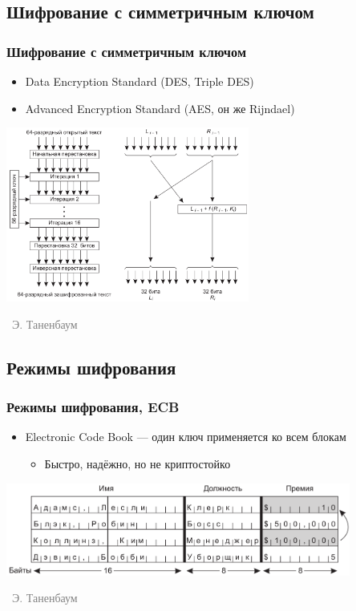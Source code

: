 \documentclass[xetex,mathserif,serif]{beamer}
\newcommand{\attribution}[1] {
\vspace{-5mm}\begin{flushright}\begin{scriptsize}\textcolor{gray}{\textcopyright\, #1}\end{scriptsize}\end{flushright}
}
\begin{document}
    \subsection{Шифрование с симметричным ключом}

    \begin{frame}
        \frametitle{Шифрование с симметричным ключом}
        \begin{itemize}
            \item Data Encryption Standard (DES, Triple DES)
            \item Advanced Encryption Standard (AES, он же Rijndael)
        \end{itemize}
        \begin{center}
            \includegraphics[width=0.6\textwidth]{des.png}
            \attribution{Э. Таненбаум}
        \end{center}
    \end{frame}

    \subsection{Режимы шифрования}

    \begin{frame}
        \frametitle{Режимы шифрования, ECB}
        \begin{itemize}
            \item Electronic Code Book --- один ключ применяется ко всем блокам
            \begin{itemize}
                \item Быстро, надёжно, но не криптостойко
            \end{itemize}
        \end{itemize}
        \begin{center}
            \includegraphics[width=0.85\textwidth]{ecbAttack.png}
            \attribution{Э. Таненбаум}
        \end{center}
    \end{frame}
\end{document}
